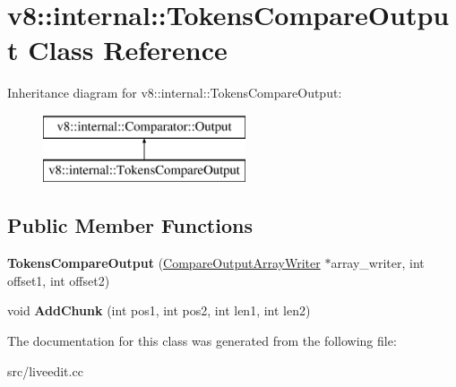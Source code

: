 \hypertarget{classv8_1_1internal_1_1_tokens_compare_output}{}\section{v8\+:\+:internal\+:\+:Tokens\+Compare\+Output Class Reference}
\label{classv8_1_1internal_1_1_tokens_compare_output}
Inheritance diagram for v8\+:\+:internal\+:\+:Tokens\+Compare\+Output\+:\begin{figure}[H]
\begin{center}
\leavevmode
\includegraphics[height=2.000000cm]{classv8_1_1internal_1_1_tokens_compare_output}
\end{center}
\end{figure}
\subsection*{Public Member Functions}
\begin{DoxyCompactItemize}
\item 
\hypertarget{classv8_1_1internal_1_1_tokens_compare_output_af208a97fd57f3a1f27153509c6afbb86}{}{\bfseries Tokens\+Compare\+Output} (\hyperlink{classv8_1_1internal_1_1_compare_output_array_writer}{Compare\+Output\+Array\+Writer} $\ast$array\+\_\+writer, int offset1, int offset2)\label{classv8_1_1internal_1_1_tokens_compare_output_af208a97fd57f3a1f27153509c6afbb86}

\item 
\hypertarget{classv8_1_1internal_1_1_tokens_compare_output_a9420834128351e8f2e745bd2838e9d6e}{}void {\bfseries Add\+Chunk} (int pos1, int pos2, int len1, int len2)\label{classv8_1_1internal_1_1_tokens_compare_output_a9420834128351e8f2e745bd2838e9d6e}

\end{DoxyCompactItemize}


The documentation for this class was generated from the following file\+:\begin{DoxyCompactItemize}
\item 
src/liveedit.\+cc\end{DoxyCompactItemize}
